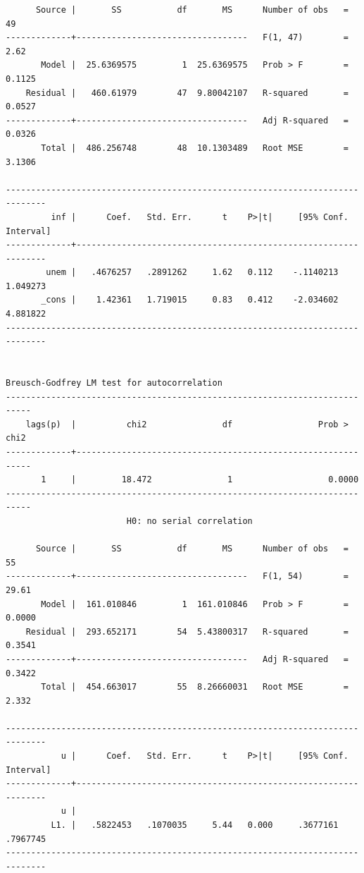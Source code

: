 \documentclass[
]{book}
\begin{document}
\begin{verbatim}
      Source |       SS           df       MS      Number of obs   =        49
-------------+----------------------------------   F(1, 47)        =      2.62
       Model |  25.6369575         1  25.6369575   Prob > F        =    0.1125
    Residual |   460.61979        47  9.80042107   R-squared       =    0.0527
-------------+----------------------------------   Adj R-squared   =    0.0326
       Total |  486.256748        48  10.1303489   Root MSE        =    3.1306

------------------------------------------------------------------------------
         inf |      Coef.   Std. Err.      t    P>|t|     [95% Conf. Interval]
-------------+----------------------------------------------------------------
        unem |   .4676257   .2891262     1.62   0.112    -.1140213    1.049273
       _cons |    1.42361   1.719015     0.83   0.412    -2.034602    4.881822
------------------------------------------------------------------------------


Breusch-Godfrey LM test for autocorrelation
---------------------------------------------------------------------------
    lags(p)  |          chi2               df                 Prob > chi2
-------------+-------------------------------------------------------------
       1     |         18.472               1                   0.0000
---------------------------------------------------------------------------
                        H0: no serial correlation

      Source |       SS           df       MS      Number of obs   =        55
-------------+----------------------------------   F(1, 54)        =     29.61
       Model |  161.010846         1  161.010846   Prob > F        =    0.0000
    Residual |  293.652171        54  5.43800317   R-squared       =    0.3541
-------------+----------------------------------   Adj R-squared   =    0.3422
       Total |  454.663017        55  8.26660031   Root MSE        =     2.332

------------------------------------------------------------------------------
           u |      Coef.   Std. Err.      t    P>|t|     [95% Conf. Interval]
-------------+----------------------------------------------------------------
           u |
         L1. |   .5822453   .1070035     5.44   0.000     .3677161    .7967745
------------------------------------------------------------------------------
\end{verbatim}
\end{document}

